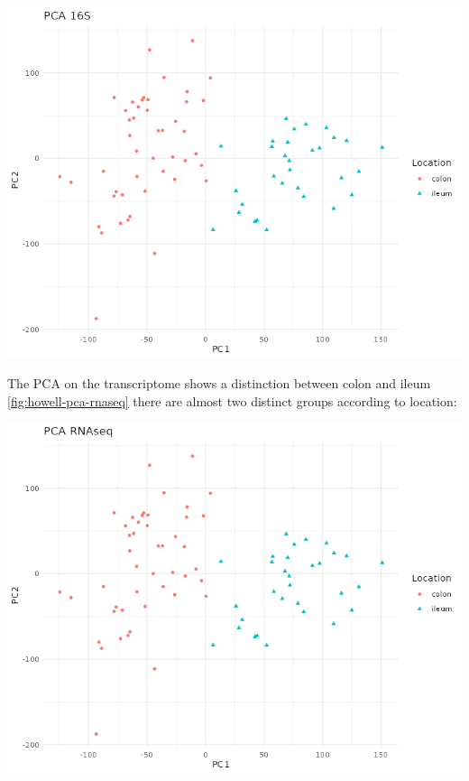 \documentclass[
  12pt,
  a4paper,
  twoside,
  openright]{book}
\let\origfigure\figure
\let\endorigfigure\endfigure
\renewenvironment{figure}[1][2] {
    \expandafter\origfigure\expandafter[!ht]
} {
    \endorigfigure
}
\begin{document}
\begin{figure}
\includegraphics[width=1\linewidth]{images/howell_PCA_16S} \caption[PCA of 16S data of Howell's dataset]{PCA of 16S data of Howell's dataset. Samples are colored by location. There are no pattern on any of the first do dimensions.}\label{fig:howell-pca-16s}
\end{figure}

The PCA on the transcriptome shows a distinction between colon and ileum \ref{fig:howell-pca-rnaseq} there are almost two distinct groups according to location:

\begin{figure}
\includegraphics[width=1\linewidth]{images/howell_PCA_RNAseq} \caption[PCA of RNASeq data of Howell's dataset]{PCA of RNAseq data of Howell's dataset. Samples are colored by location. There are two groups of samples according to their location.}\label{fig:howell-pca-rnaseq}
\end{figure}
\end{document}

